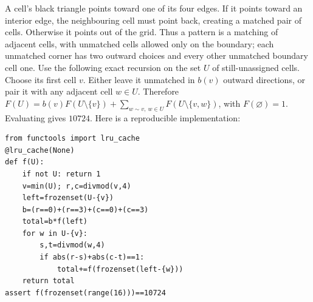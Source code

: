 A cell's black triangle points toward one of its four edges. If it points toward an interior edge, the neighbouring cell must point back, creating a matched pair of cells. Otherwise it points out of the grid. Thus a pattern is a matching of adjacent cells, with unmatched cells allowed only on the boundary; each unmatched corner has two outward choices and every other unmatched boundary cell one. Use the following exact recursion on the set $U$ of still-unassigned cells. Choose its first cell $v$. Either leave it unmatched in $b(v)$ outward directions, or pair it with any adjacent cell $w\in U$. Therefore $F(U)=b(v)F(U\setminus\{v\})+\sum_{w\sim v,\ w\in U}F(U\setminus\{v,w\})$, with $F(\varnothing)=1$. Evaluating gives $\boxed{10724}$. Here is a reproducible implementation:\begin{verbatim}
from functools import lru_cache
@lru_cache(None)
def f(U):
    if not U: return 1
    v=min(U); r,c=divmod(v,4)
    left=frozenset(U-{v})
    b=(r==0)+(r==3)+(c==0)+(c==3)
    total=b*f(left)
    for w in U-{v}:
        s,t=divmod(w,4)
        if abs(r-s)+abs(c-t)==1:
            total+=f(frozenset(left-{w}))
    return total
assert f(frozenset(range(16)))==10724
\end{verbatim}
